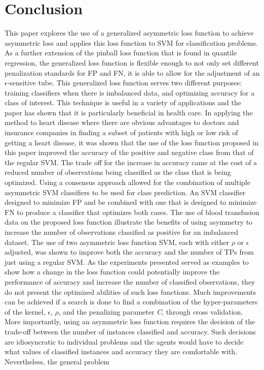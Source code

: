 \documentclass[twoside,11pt]{article}
\begin{document}
\section{Conclusion}
 This paper explores the use of a generalized asymmetric loss function to achieve asymmetric loss and applies this loss function to SVM for classification problems. As a further extension of the pinball loss function that is found in quantile regression, the generalized loss function is flexible enough to not only set different penalization standards for FP and FN, it is able to allow for the adjustment of an  $\epsilon$-sensitive tube. This generalized loss function serves two different purposes: training classifiers when there is imbalanced data, and optimizing accuracy for a class of interest. This technique is useful in a variety of applications and the paper has shown that it is particularly beneficial in health care. In applying the method to heart disease where there are obvious advantages to doctors and insurance companies in finding a subset of patients with high or low risk of getting a heart disease, it was shown that the use of the loss function proposed in this paper improved the accuracy of the positive and negative class from that of the regular SVM. The trade off for the increase in accuracy came at the cost of a reduced number of observations being classified as the class that is being optimized. Using a consensus approach allowed for the combination of multiple asymmetric SVM classifiers to be used for class prediction. An SVM classifier designed to minimize FP and be combined with one that is designed to minimize FN to produce a classifier that optimizes both cases. The use of blood transfusion data on the proposed loss function illustrate the benefits of using asymmetry to increase the number of observations classified as positive for an imbalanced dataset. The use of two asymmetric loss function SVM, each with either $\rho$ or $\epsilon$ adjusted, was shown to improve both the accuracy and the number of TPs from just using a regular SVM. As the experiments presented served as examples to show how a change in the loss function could potentially improve the performance of accuracy and increase the number of classified observations, they do not present the optimized abilities of such loss functions. Much improvements can be achieved if a search is done to find a combination of the hyper-parameters of the kernel, $\epsilon$, $\rho$, and the penalizing parameter \emph{C}, through cross validation. More importantly, using an asymmetric loss function requires the decision of the trade-off between the number of instances classified and accuracy. Such decisions are idiosyncratic to individual problems and the agents would have to decide what values of classified instances and accuracy they are comfortable with. Nevertheless, the general problem
\end{document}
